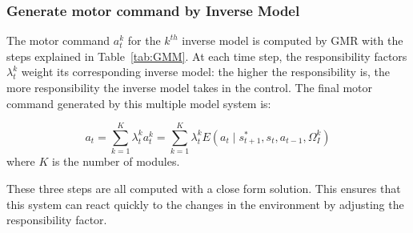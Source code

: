 \subsubsection{Generate motor command by Inverse Model}
\label{cha4:sec2:control:inverse}


The motor command $a^k_t$ for the $k^{th}$ inverse model is computed
by GMR with the steps explained in Table~\ref{tab:GMM}. At each time
step, the responsibility factors $\lambda^k_t$ weight its
corresponding inverse model: the higher the responsibility is, the
more responsibility the inverse model takes in the control. The final
motor command generated by this multiple model system is:

\begin{equation}
\label{e_mix}
a_t = \sum_{k=1}^K{\lambda_t^k a_t^k} = \sum_{k=1}^K{\lambda_t^k E\left({a_t \mid s^*_{t+1},s_t, a_{t-1}, \Omega^k_I}\right)}
\end{equation}
where $K$ is the number of modules.

These three steps are all computed with a close form solution. This ensures that this system can react quickly to the changes in the environment by adjusting the responsibility factor.



